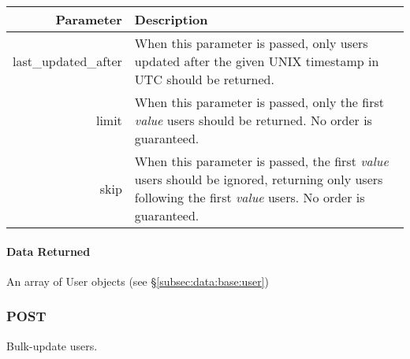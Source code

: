 \documentclass[10pt,letterpaper,titlepage]{report}
\begin{document}
\begin{center}
	\begin{tabular}{| r | p{8cm} |}
		\hline
	
		\textbf{Parameter} & \textbf{Description} \\ \hline
	
		last\_updated\_after & When this parameter is passed, only users updated after the given UNIX timestamp in UTC should be returned. \\ \hline
	
		limit & When this parameter is passed, only the first \textit{value} users should be returned. No order is guaranteed.  \\ \hline
	
		skip & When this parameter is passed, the first \textit{value} users should be ignored, returning only users following the first \textit{value} users. No order is guaranteed. \\ \hline
	\end{tabular}
\end{center}

\paragraph{Data Returned}

An array of User objects (see \S\ref{subsec:data:base:user})

\subsubsection{POST}

Bulk-update users.
\end{document}
